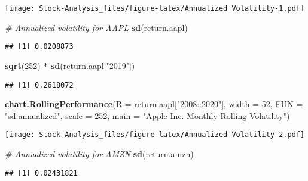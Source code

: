 \documentclass[
]{article}
\newenvironment{Shaded}{\begin{snugshade}}{\end{snugshade}}
\newcommand{\CommentTok}[1]{\textcolor[rgb]{0.56,0.35,0.01}{\textit{#1}}}
\newcommand{\DataTypeTok}[1]{\textcolor[rgb]{0.13,0.29,0.53}{#1}}
\newcommand{\DecValTok}[1]{\textcolor[rgb]{0.00,0.00,0.81}{#1}}
\newcommand{\KeywordTok}[1]{\textcolor[rgb]{0.13,0.29,0.53}{\textbf{#1}}}
\newcommand{\NormalTok}[1]{#1}
\newcommand{\OperatorTok}[1]{\textcolor[rgb]{0.81,0.36,0.00}{\textbf{#1}}}
\newcommand{\StringTok}[1]{\textcolor[rgb]{0.31,0.60,0.02}{#1}}
\begin{document}
\texttt{[image: Stock-Analysis\_files/figure-latex/Annualized Volatility-1.pdf]}

\begin{Shaded}
\begin{Highlighting}[]
\CommentTok{# Annualized volatility for AAPL}
\KeywordTok{sd}\NormalTok{(return.aapl)}
\end{Highlighting}
\end{Shaded}

\begin{verbatim}
## [1] 0.0208873
\end{verbatim}

\begin{Shaded}
\begin{Highlighting}[]
\KeywordTok{sqrt}\NormalTok{(}\DecValTok{252}\NormalTok{) }\OperatorTok{*}\StringTok{ }\KeywordTok{sd}\NormalTok{(return.aapl[}\StringTok{"2019"}\NormalTok{])}
\end{Highlighting}
\end{Shaded}

\begin{verbatim}
## [1] 0.2618072
\end{verbatim}

\begin{Shaded}
\begin{Highlighting}[]
\KeywordTok{chart.RollingPerformance}\NormalTok{(}\DataTypeTok{R =}\NormalTok{ return.aapl[}\StringTok{"2008::2020"}\NormalTok{],}
                         \DataTypeTok{width =} \DecValTok{52}\NormalTok{,}
                         \DataTypeTok{FUN =} \StringTok{"sd.annualized"}\NormalTok{,}
                         \DataTypeTok{scale =} \DecValTok{252}\NormalTok{,}
                         \DataTypeTok{main =} \StringTok{"Apple Inc. Monthly Rolling Volatility"}\NormalTok{)}
\end{Highlighting}
\end{Shaded}

\texttt{[image: Stock-Analysis\_files/figure-latex/Annualized Volatility-2.pdf]}

\begin{Shaded}
\begin{Highlighting}[]
\CommentTok{# Annualized volatility for AMZN}
\KeywordTok{sd}\NormalTok{(return.amzn)}
\end{Highlighting}
\end{Shaded}

\begin{verbatim}
## [1] 0.02431821
\end{verbatim}
\end{document}
